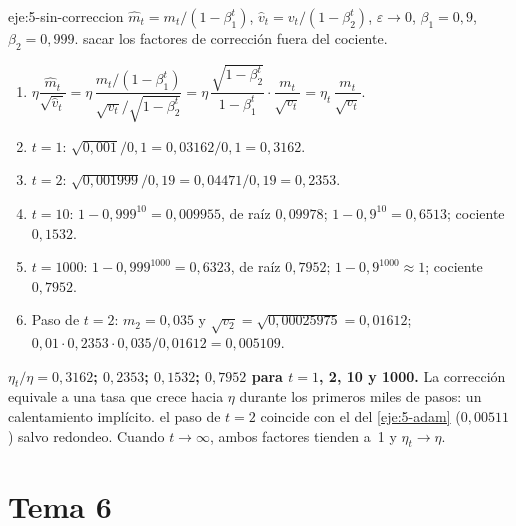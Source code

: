 \begin{solucion}{eje:5-sin-correccion}
\datos $\hat m_t=m_t/(1-\beta_1^{t})$, $\hat v_t=v_t/(1-\beta_2^{t})$, $\varepsilon\to 0$, $\beta_1=0{,}9$, $\beta_2=0{,}999$.
\planteamiento sacar los factores de corrección fuera del cociente.
\pasos
\begin{enumerate}[label=\arabic*.]
  \item $\eta\dfrac{\hat m_t}{\sqrt{\hat v_t}}=\eta\,\dfrac{m_t/(1-\beta_1^{t})}{\sqrt{v_t}/\sqrt{1-\beta_2^{t}}}=\eta\,\dfrac{\sqrt{1-\beta_2^{t}}}{1-\beta_1^{t}}\cdot\dfrac{m_t}{\sqrt{v_t}}=\eta_t\,\dfrac{m_t}{\sqrt{v_t}}$.
  \item $t=1$: $\sqrt{0{,}001}/0{,}1=0{,}03162/0{,}1=0{,}3162$.
  \item $t=2$: $\sqrt{0{,}001999}/0{,}19=0{,}04471/0{,}19=0{,}2353$.
  \item $t=10$: $1-0{,}999^{10}=0{,}009955$, de raíz $0{,}09978$; $1-0{,}9^{10}=0{,}6513$; cociente $0{,}1532$.
  \item $t=1000$: $1-0{,}999^{1000}=0{,}6323$, de raíz $0{,}7952$; $1-0{,}9^{1000}\approx 1$; cociente $0{,}7952$.
  \item Paso de $t=2$: $m_2=0{,}035$ y $\sqrt{v_2}=\sqrt{0{,}00025975}=0{,}01612$; $0{,}01\cdot 0{,}2353\cdot 0{,}035/0{,}01612=0{,}005109$.
\end{enumerate}
\resultado \textbf{$\eta_t/\eta=0{,}3162$; $0{,}2353$; $0{,}1532$; $0{,}7952$ para $t=1$, 2, 10 y 1000.} La corrección equivale a una tasa que crece hacia $\eta$ durante los primeros miles de pasos: un calentamiento implícito.
\comprobacion el paso de $t=2$ coincide con el del \cref{eje:5-adam} ($0{,}00511$) salvo redondeo. Cuando $t\to\infty$, ambos factores tienden a~1 y $\eta_t\to\eta$.
\end{solucion}

\section{Tema 6}

